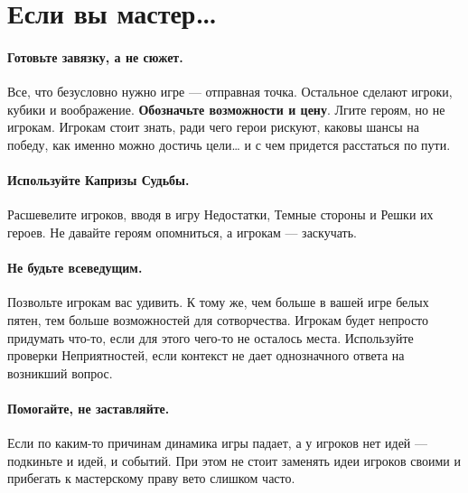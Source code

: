 \section*{Если вы мастер…}

\paragraph{Готовьте завязку, а не сюжет.} Все, что безусловно нужно игре — отправная точка. Остальное сделают игроки, кубики и воображение. \textbf{Обозначьте возможности и цену}. Лгите героям, но не игрокам. Игрокам стоит знать, ради чего герои рискуют, каковы шансы на победу, как именно можно достичь цели… и с чем придется расстаться по пути.
\paragraph{Используйте Капризы Судьбы.} Расшевелите игроков, вводя в игру Недостатки, Темные стороны и Решки их героев. Не давайте героям опомниться, а игрокам — заскучать.
\paragraph{Не будьте всеведущим.} Позвольте игрокам вас удивить. К тому же, чем больше в вашей игре белых пятен, тем больше возможностей для сотворчества. Игрокам будет непросто придумать что-то, если для этого чего-то не осталось места. Используйте проверки Неприятностей, если контекст не дает однозначного ответа на возникший вопрос.
\paragraph{Помогайте, не заставляйте.} Если по каким-то причинам динамика игры падает, а у игроков нет идей — подкиньте и идей, и событий. При этом не стоит заменять идеи игроков своими и прибегать к мастерскому праву вето слишком часто.